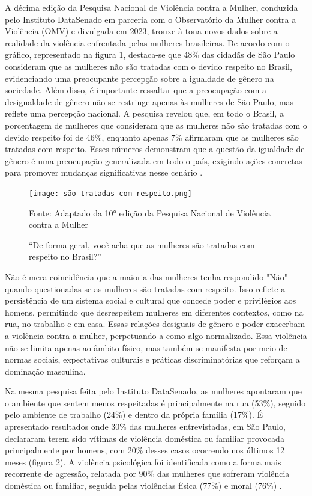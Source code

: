 \documentclass[
    article,			%
    12pt,				%
    oneside,            %
    a4paper,			%
    english,			%
    brazil,				%
    ]{abntex2}
\begin{document}
    A décima edição da Pesquisa Nacional de Violência contra a Mulher, conduzida pelo Instituto DataSenado em parceria com o Observatório da Mulher contra a Violência (OMV) e divulgada em 2023, trouxe à tona novos dados sobre a realidade da violência enfrentada pelas mulheres brasileiras. De acordo com o gráfico, representado na figura 1, destaca-se que 48\% das cidadãs de São Paulo consideram que as mulheres não são tratadas com o devido respeito no Brasil, evidenciando uma preocupante percepção sobre a igualdade de gênero na sociedade. Além disso, é importante ressaltar que a preocupação com a desigualdade de gênero não se restringe apenas às mulheres de São Paulo, mas reflete uma percepção nacional. A pesquisa revelou que, em todo o Brasil, a porcentagem de mulheres que consideram que as mulheres não são tratadas com o devido respeito foi de 46\%, enquanto apenas 7\% afirmaram que as mulheres são tratadas com respeito. Esses números demonstram que a questão da igualdade de gênero é uma preocupação generalizada em todo o país, exigindo ações concretas para promover mudanças significativas nesse cenário \cite{senadoBR_2021} \cite{senadoSP_2023}.

\begin{figure}[ht]
    \centering
    \texttt{[image: são tratadas com respeito.png]}\\
    \caption{“De forma geral, você acha que as mulheres são tratadas com respeito no Brasil?”}
        Fonte: Adaptado da 10° edição da Pesquisa Nacional de Violência contra a Mulher
    \label{fig:infografico}
\end{figure}

    Não é mera coincidência que a maioria das mulheres tenha respondido "Não" \space quando questionadas se as mulheres são tratadas com respeito. Isso reflete a persistência de um sistema social e cultural que concede poder e privilégios aos homens, permitindo que desrespeitem mulheres em diferentes contextos, como na rua, no trabalho e em casa. Essas relações desiguais de gênero e poder exacerbam a violência contra a mulher, perpetuando-a como algo normalizado. Essa violência não se limita apenas ao âmbito físico, mas também se manifesta por meio de normas sociais, expectativas culturais e práticas discriminatórias que reforçam a dominação masculina. 

    Na mesma pesquisa feita pelo Instituto DataSenado, as mulheres apontaram que o ambiente que sentem menos respeitadas é principalmente na rua (53\%), seguido pelo ambiente de trabalho (24\%) e dentro da própria família (17\%). É apresentado resultados onde 30\% das mulheres entrevistadas, em São Paulo, declararam terem sido vítimas de violência doméstica ou familiar provocada principalmente por homens, com 20\% desses casos ocorrendo nos últimos 12 meses (figura 2). A violência psicológica foi identificada como a forma mais recorrente de agressão, relatada por 90\% das mulheres que sofreram violência doméstica ou familiar, seguida pelas violências física (77\%) e moral (76\%) \cite{senadoSP_2023}.
\end{document}
